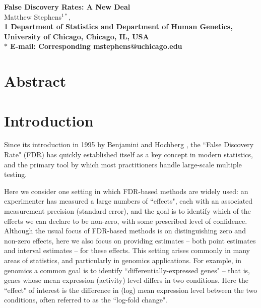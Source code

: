 \documentclass[11pt]{article}
\date{}
\begin{document}
\begin{flushleft}
{\Large
\textbf{False Discovery Rates: A New Deal}
}
\\
Matthew Stephens$^{1*}$, 
\\
\bf{1} Department of Statistics and Department of Human Genetics, University of Chicago, Chicago, IL, USA
\\
$\ast$ E-mail: Corresponding mstephens@uchicago.edu
\end{flushleft}

\section*{Abstract}


\section*{Introduction}

Since its introduction in 1995 by Benjamini and Hochberg 
\cite{benjamini1995controlling}, the ``False Discovery Rate" (FDR) has quickly established itself
as a key concept in modern statistics, and the primary tool by which most practitioners handle large-scale multiple testing.

Here we consider one setting in which FDR-based methods are widely used:
an experimenter has measured a large numbers of ``effects", each with an associated
measurement precision (standard error), 
and the goal is to identify which of the effects we can declare to be non-zero, with some prescribed level of confidence.
Although the usual focus of FDR-based methods is on distinguishing zero and non-zero effects,
here we also focus on providing estimates -- both point estimates and interval estimates -- for these effects.
This setting arises commonly in many areas of statistics, and particularly in genomics applications.
For example, in genomics
a common goal is to identify ``differentially-expressed genes" -- that is, genes
whose mean expression (activity) level differs in two conditions. Here the ``effect" of interest is the difference in (log) 
mean expression level between the two conditions, often referred to as the ``log-fold change". 
\end{document}
